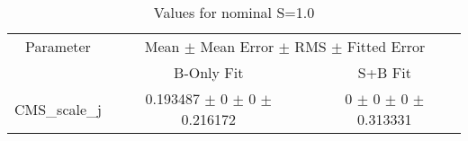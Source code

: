 \begin{table}
\centering
\caption{Values for nominal S=1.0}
\begin{tabular}{ccc}
\toprule
Parameter & \multicolumn{2}{c}{Mean $\pm$ Mean Error $\pm$ RMS $\pm$ Fitted Error}\\
 & B-Only Fit & S+B Fit\\
\midrule
CMS\_scale\_j & \num{0.193487} $\pm$ \num{0} $\pm$ \num{0} $\pm$ \num{0.216172} & \num{0} $\pm$ \num{0} $\pm$ \num{0} $\pm$ \num{0.313331}\\
\bottomrule
\end{tabular}
\end{table}